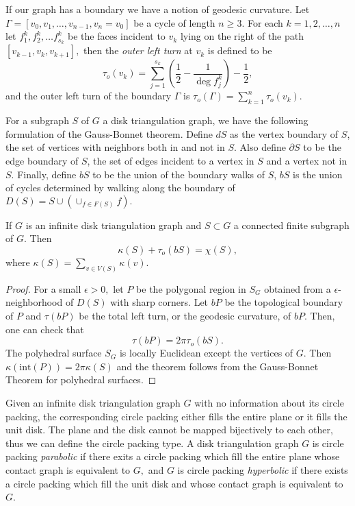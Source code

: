 If our graph has a boundary we have a notion of geodesic curvature.
Let $\Gamma=[v_0,v_1,\ldots, v_{n-1},v_n=v_0]$ be a cycle of length $n\geq 3.$
For each $k=1,2,\ldots, n$ let $f_1^k,f_2^k,\ldots f_{s_k}^k$ be the faces incident to $v_k$
lying on the right of the path $[v_{k-1},v_k,v_{k+1}],$ then the \emph{outer left turn} at $v_k$
is defined to be
\begin{equation}\label{eqn:outer-left}
\tau_o(v_k)=\sum_{j=1}^{s_k}\left(\frac{1}{2}-\frac{1}{\deg f_j^k}\right)-\frac{1}{2},
\end{equation}
and the outer left turn of the boundary $\Gamma$ is $\tau_o(\Gamma)=\sum_{k=1}^n\tau_o(v_k)$.

For a subgraph $S$ of $G$ a disk triangulation graph, we have the following formulation of the Gauss-Bonnet theorem. Define $dS$ as the vertex boundary of $S$, the set of vertices with neighbors both in and not in $S$. Also define $\partial S$ to be the edge boundary of $S$, the set of edges incident to a vertex in $S$ and a vertex not in $S$. Finally, define $bS$ to be the union of the boundary walks of $S$, $bS$ is the union of cycles determined by walking along the boundary of $D(S)=S\cup \left(\cup_{f\in F(S)}f\right).$


\begin{theorem}\label{thm:CPGB}
If $G$ is an infinite disk triangulation graph and $S\subset G$ a connected finite subgraph of $G.$
Then 
$$\kappa(S)+\tau_o(bS)=\chi(S),$$
where $\kappa(S)=\sum_{v\in V(S)}\kappa (v).$
\end{theorem}

\begin{proof}
	For a small $\epsilon>0,$ let $P$ be the polygonal region in $S_G$ obtained
	from a $\epsilon$-neighborhood of $D(S)$ with sharp corners.
	Let $bP$ be the topological boundary of $P$ and $\tau(bP)$ be the total left turn, or the 
	geodesic curvature, of $bP.$ Then, one can check that 
	$$\tau(bP)=2\pi \tau_o(bS).$$
	The polyhedral surface $S_G$ is locally Euclidean except the vertices of $G$.
	Then $\kappa(\text{int} (P))=2\pi \kappa(S)$ and the theorem follows from the Gauss-Bonnet Theorem
	for polyhedral surfaces.
\end{proof}



Given an infinite disk triangulation graph $G$ with no information about
its circle packing, the corresponding circle packing either fills
the entire plane or it fills the unit disk.
The plane and the disk cannot be mapped bijectively to each other, thus
we can define the circle packing type. A disk triangulation graph $G$ is circle packing
 \emph{parabolic} if there exits a circle packing which fill the entire plane 
 whose contact graph is equivalent to $G,$ and $G$ is circle packing \emph{hyperbolic}
 if there exists a circle packing which fill the unit disk and whose contact graph
 is equivalent to $G$.

